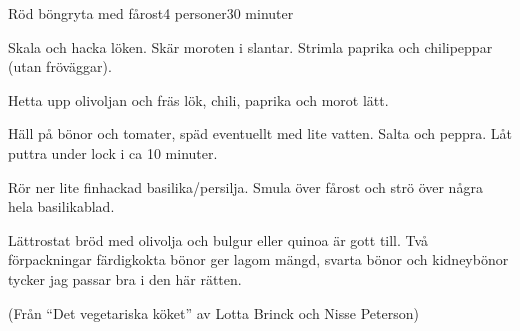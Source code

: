 \documentclass[a4wide, 10pt]{article}
\begin{document}
\begin{recipe}{Röd böngryta med fårost}{4 personer}{30 minuter}


Skala och hacka löken. Skär moroten i slantar. Strimla paprika och
chilipeppar (utan fröväggar).

Hetta upp olivoljan och fräs lök, chili, paprika och morot lätt.


Häll på bönor och tomater, späd eventuellt med lite vatten. Salta och
peppra. Låt puttra under lock i ca 10 minuter.

Rör ner lite finhackad basilika/persilja. Smula över fårost och strö
över några hela basilikablad.

\end{recipe}

Lättrostat bröd med olivolja och bulgur eller quinoa är gott till. Två
förpackningar färdigkokta bönor ger lagom mängd, svarta bönor och
kidneybönor tycker jag passar bra i den här rätten.

(Från ``Det vegetariska köket'' av Lotta Brinck och Nisse Peterson)
\end{document}
